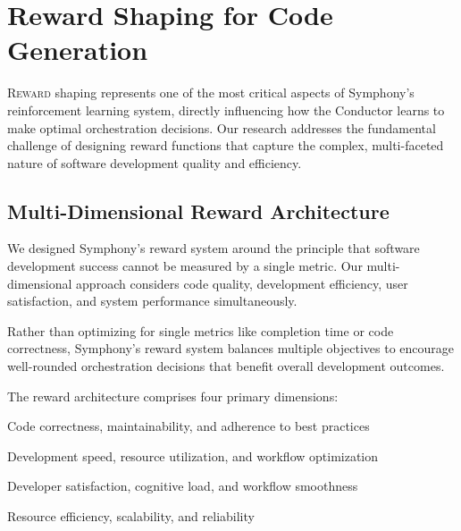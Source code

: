 
\section*{Reward Shaping for Code Generation}

\lettrine{R}{eward} shaping represents one of the most critical aspects of Symphony's reinforcement learning system, directly influencing how the Conductor learns to make optimal orchestration decisions. Our research addresses the fundamental challenge of designing reward functions that capture the complex, multi-faceted nature of software development quality and efficiency.

\subsection*{Multi-Dimensional Reward Architecture}

We designed Symphony's reward system around the principle that software development success cannot be measured by a single metric. Our multi-dimensional approach considers code quality, development efficiency, user satisfaction, and system performance simultaneously.

\begin{infobox}[title=Holistic Reward Design]
Rather than optimizing for single metrics like completion time or code correctness, Symphony's reward system balances multiple objectives to encourage well-rounded orchestration decisions that benefit overall development outcomes.
\end{infobox}

The reward architecture comprises four primary dimensions:

\begin{description}[leftmargin=4cm,labelwidth=3.5cm]
    \item[\textbf{Quality Metrics}] Code correctness, maintainability, and adherence to best practices
    \item[\textbf{Efficiency Metrics}] Development speed, resource utilization, and workflow optimization
    \item[\textbf{User Experience}] Developer satisfaction, cognitive load, and workflow smoothness
    \item[\textbf{System Performance}] Resource efficiency, scalability, and reliability
\end{description}

